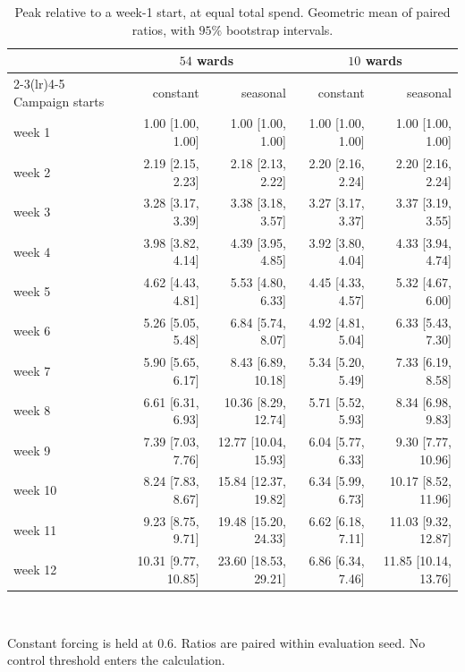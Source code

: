 \begin{table}[htbp]
\centering\small
\caption{Peak relative to a week-1 start, at equal total spend. Geometric mean of paired ratios, with $95\%$ bootstrap intervals.}
\label{tab:delay_ratios}
\begin{tabular}{@{}lrrrr@{}}
\toprule
 & \multicolumn{2}{c}{$54$ wards} & \multicolumn{2}{c}{$10$ wards} \\
\cmidrule(lr){2-3}\cmidrule(lr){4-5}
Campaign starts & constant & seasonal & constant & seasonal \\
\midrule
week 1 & 1.00 [1.00, 1.00] & 1.00 [1.00, 1.00] & 1.00 [1.00, 1.00] & 1.00 [1.00, 1.00] \\
week 2 & 2.19 [2.15, 2.23] & 2.18 [2.13, 2.22] & 2.20 [2.16, 2.24] & 2.20 [2.16, 2.24] \\
week 3 & 3.28 [3.17, 3.39] & 3.38 [3.18, 3.57] & 3.27 [3.17, 3.37] & 3.37 [3.19, 3.55] \\
week 4 & 3.98 [3.82, 4.14] & 4.39 [3.95, 4.85] & 3.92 [3.80, 4.04] & 4.33 [3.94, 4.74] \\
week 5 & 4.62 [4.43, 4.81] & 5.53 [4.80, 6.33] & 4.45 [4.33, 4.57] & 5.32 [4.67, 6.00] \\
week 6 & 5.26 [5.05, 5.48] & 6.84 [5.74, 8.07] & 4.92 [4.81, 5.04] & 6.33 [5.43, 7.30] \\
week 7 & 5.90 [5.65, 6.17] & 8.43 [6.89, 10.18] & 5.34 [5.20, 5.49] & 7.33 [6.19, 8.58] \\
week 8 & 6.61 [6.31, 6.93] & 10.36 [8.29, 12.74] & 5.71 [5.52, 5.93] & 8.34 [6.98, 9.83] \\
week 9 & 7.39 [7.03, 7.76] & 12.77 [10.04, 15.93] & 6.04 [5.77, 6.33] & 9.30 [7.77, 10.96] \\
week 10 & 8.24 [7.83, 8.67] & 15.84 [12.37, 19.82] & 6.34 [5.99, 6.73] & 10.17 [8.52, 11.96] \\
week 11 & 9.23 [8.75, 9.71] & 19.48 [15.20, 24.33] & 6.62 [6.18, 7.11] & 11.03 [9.32, 12.87] \\
week 12 & 10.31 [9.77, 10.85] & 23.60 [18.53, 29.21] & 6.86 [6.34, 7.46] & 11.85 [10.14, 13.76] \\
\bottomrule
\end{tabular}
\\[2pt]\parbox{0.92\textwidth}{\footnotesize Constant forcing is held at $0.6$. Ratios are paired within evaluation seed. No control threshold enters the calculation.}
\end{table}
